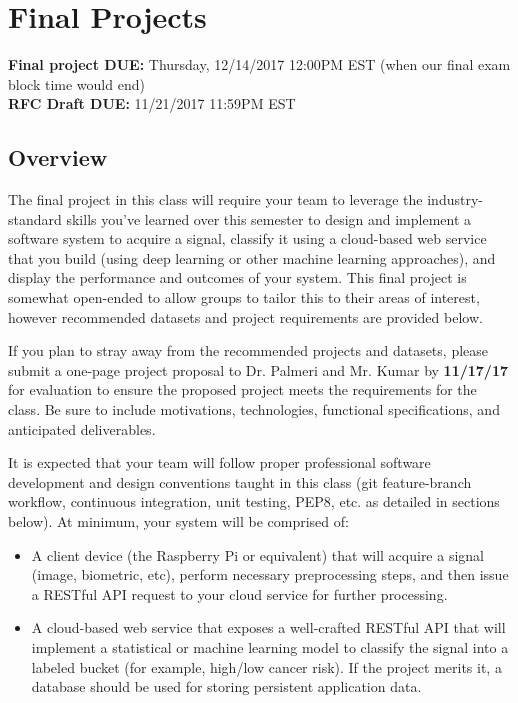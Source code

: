 
\usepackage{hyperref}



\section*{Final Projects}
{\bf Final project DUE:} Thursday, 12/14/2017 12:00PM EST (when our final exam block time would end) \\
{\bf RFC Draft DUE:} 11/21/2017 11:59PM EST 

\subsection*{Overview}
The final project in this class will require your team to leverage the industry-standard skills you've learned over this semester to design and implement a software system to acquire a signal, classify it using a cloud-based web service that you build (using deep learning or other machine learning approaches), and display the performance and outcomes of your system. This final project is somewhat open-ended to allow groups to tailor this to their areas of interest, however recommended datasets and project requirements are provided below. 

If you plan to stray away from the recommended projects and datasets, please submit a one-page project proposal to Dr. Palmeri and Mr. Kumar by {\bf 11/17/17} for evaluation to ensure the proposed project meets the requirements for the class. Be sure to include motivations, technologies, functional specifications, and anticipated deliverables.

It is expected that your team will follow proper professional software development and design conventions taught in this class (git feature-branch workflow, continuous integration, unit testing, PEP8, etc. as detailed in sections below). At minimum, your system will be comprised of:

\begin{itemize}
	\item A client device (the Raspberry Pi or equivalent) that will acquire a signal (image, biometric, etc), perform necessary preprocessing steps, and then issue a RESTful API request to your cloud service for further processing.
	\item A cloud-based web service that exposes a well-crafted RESTful API that will implement a statistical or machine learning model to classify the signal into a labeled bucket (for example, high/low cancer risk). If the project merits it, a database should be used for storing persistent application data.
\end{itemize}

